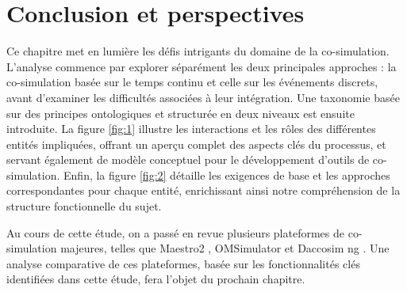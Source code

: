 \section{Conclusion et perspectives}
Ce chapitre met en lumière les défis intrigants du domaine de la co-simulation. L'analyse commence par explorer séparément les deux principales approches : la co-simulation basée sur le temps continu et celle sur les événements discrets, avant d'examiner les difficultés associées à leur intégration. Une taxonomie basée sur des principes ontologiques et structurée en deux niveaux est ensuite introduite. La figure \ref{fig:1} illustre les interactions et les rôles des différentes entités impliquées, offrant un aperçu complet des aspects clés du processus, et servant également de modèle conceptuel pour le développement d'outils de co-simulation. Enfin, la figure \ref{fig:2} détaille les exigences de base et les approches correspondantes pour chaque entité, enrichissant ainsi notre compréhension de la structure fonctionnelle du sujet.

Au cours de cette étude, on a passé en revue plusieurs plateformes de co-simulation majeures, telles que Maestro2 \cite{b13}, OMSimulator\cite{b14} et Daccosim ng \cite{b15}. Une analyse comparative de ces plateformes, basée sur les fonctionnalités clés identifiées dans cette étude, fera l'objet du prochain chapitre.

